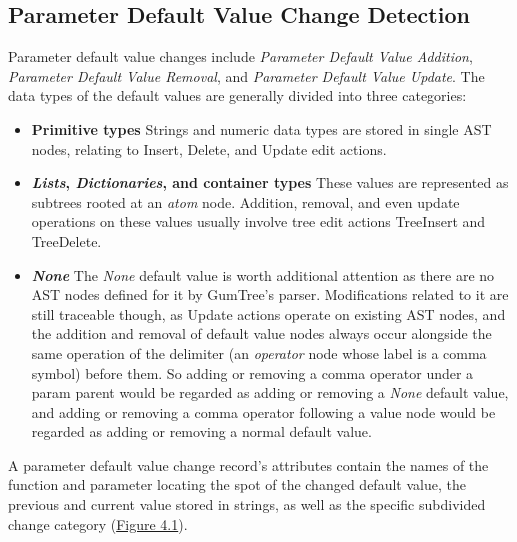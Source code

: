 \subsection{Parameter Default Value Change Detection}

Parameter default value changes include \textit{Parameter Default Value Addition}, \textit{Parameter Default Value Removal}, and \textit{Parameter Default Value Update}. The data types of the default values are generally divided into three categories:

\begin{itemize}
	\item \textbf{Primitive types} Strings and numeric data types are stored in single AST nodes, relating to Insert, Delete, and Update edit actions.
	\item \textbf{\textit{Lists}, \textit{Dictionaries}, and container types} These values are represented as subtrees rooted at an \textit{atom} node. Addition, removal, and even update operations on these values usually involve tree edit actions TreeInsert and TreeDelete.
	\item \textbf{\textit{None}} The \textit{None} default value is worth additional attention as there are no AST nodes defined for it by GumTree's parser. Modifications related to it are still traceable though, as Update actions operate on existing AST nodes, and the addition and removal of default value nodes always occur alongside the same operation of the delimiter (an \textit{operator} node whose label is a comma symbol) before them. So adding or removing a comma operator under a param parent would be regarded as adding or removing a \textit{None} default value, and adding or removing a comma operator following a value node would be regarded as adding or removing a normal default value.
\end{itemize}

A parameter default value change record's attributes contain the names of the function and parameter locating the spot of the changed default value, the previous and current value stored in strings, as well as the specific subdivided change category (\hyperref[fig:ccdetector-class-design]{Figure 4.1}).

